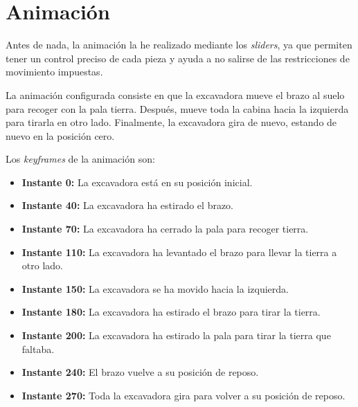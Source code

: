 \section{Animación}

Antes de nada, la animación la he realizado mediante los \textit{sliders}, ya que permiten tener un control preciso de cada pieza y ayuda a no salirse de las restricciones de movimiento impuestas.

\bigskip

La animación configurada consiste en que la excavadora mueve el brazo al suelo para recoger con la pala tierra. Después, mueve toda la cabina hacia la izquierda para tirarla en otro lado. Finalmente, la excavadora gira de nuevo, estando de nuevo en la posición cero.

\bigskip

Los \textit{keyframes} de la animación son:

\begin{itemize}
    \item \textbf{Instante 0: }La excavadora está en su posición inicial.
    \item \textbf{Instante 40: }La excavadora ha estirado el brazo.
    \item \textbf{Instante 70: }La excavadora ha cerrado la pala para recoger tierra.
    \item \textbf{Instante 110: }La excavadora ha levantado el brazo para llevar la tierra a otro lado.
    \item \textbf{Instante 150: }La excavadora se ha movido hacia la izquierda.
    \item \textbf{Instante 180: }La excavadora ha estirado el brazo para tirar la tierra.
    \item \textbf{Instante 200: }La excavadora ha estirado la pala para tirar la tierra que faltaba.
    \item \textbf{Instante 240: }El brazo vuelve a su posición de reposo.
    \item \textbf{Instante 270: }Toda la excavadora gira para volver a su posición de reposo.
\end{itemize}

